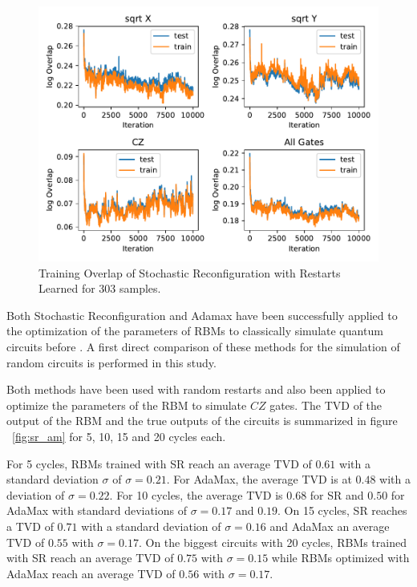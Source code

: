 \begin{figure}[H]
  \centering
  \includegraphics[width=\textwidth]{figures/results/SR-restarts-learned/avgOverlap_303.pdf}
  \caption[Training Overlap of Stochastic Reconfiguration with Restarts Learned]{Training 
  Overlap of Stochastic Reconfiguration with Restarts Learned for 303 samples.}
  \label{fig:sr_tvd}
\end{figure}

\iffalse 
Both Stochastic Reconfiguration and Adamax have been successfully applied to the 
optimization of the parameters of RBMs to classically simulate quantum circuits before \cite{}.
A first direct comparison of these methods for the simulation of random circuits is 
performed in this study. 

Both methods have been used with random restarts and also 
been applied to optimize the parameters of the RBM to simulate $CZ$ gates. 
The TVD of the output of the RBM and the true outputs of the circuits is summarized in 
figure ~\ref{fig:sr_am} for 5, 10, 15 and 20 cycles each.

For 5 cycles, RBMs trained with SR reach an average TVD of $0.61$ with a standard deviation $\sigma$ of 
$\sigma=0.21$. For AdaMax, the average TVD is at $0.48$ with a deviation of $\sigma=0.22$. For 10 cycles, the average TVD is $0.68$ for SR and $0.50$ for AdaMax with standard deviations of 
$\sigma=0.17$ and $0.19$. On 15 cycles, SR reaches a TVD of $0.71$ with a standard deviation of $\sigma=0.16$ and 
AdaMax an average TVD of $0.55$ with $\sigma=0.17$. On the biggest circuits with 20 cycles, RBMs trained with 
SR reach an average TVD of $0.75$ with $\sigma=0.15$ while RBMs optimized with AdaMax reach an 
average TVD of $0.56$ with $\sigma=0.17$. 

